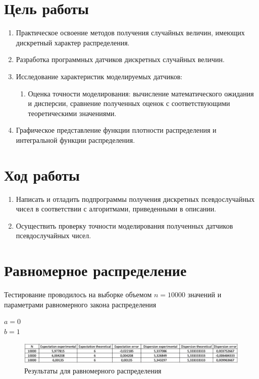 \documentclass{article}
\begin{document}
	\section{Цель работы}
	\begin{enumerate}
	\item Практическое освоение методов получения случайных величин, имеющих дискретный характер распределения.
	\item Разработка программных датчиков дискретных случайных величин.
	\item Исследование характеристик моделируемых датчиков:
	\begin{enumerate}
		\item Оценка точности моделирования: вычисление математического ожидания и дисперсии, сравнение полученных оценок с соответствующими теоретическими значениями.
	\end{enumerate}
	\item Графическое представление функции плотности распределения и интегральной функции распределения.
	\end{enumerate}
	\newpage
	
	\section{Ход работы}
		\begin {enumerate}
			\item Написать и отладить подпрограммы получения дискретных псевдослучайных чисел в соответствии с алгоритмами, приведенными в описании.
			\item Осуществить проверку точности моделирования полученных датчиков псевдослучайных чисел.
		\end{enumerate}
	\newpage
	
	\section{Равномерное распределение}
		Тестирование проводилось на выборке объемом $n = 10000$ значений и параметрами равномерного закона распределения
		\begin{center}
			$a = 0$\\ 
			$b = 1$\\
		\end{center}
		\begin{center}
			\begin{figure}[!htb]
				\includegraphics[scale = 0.49]{uniform/1.png}
				\caption{Результаты для равномерного распределения}
			\end{figure}
		\end{center}
		
\end{document}
